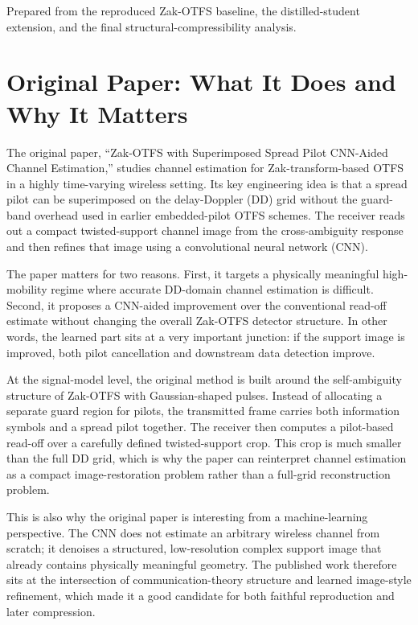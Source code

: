 \documentclass[10pt]{article}
\begin{document}
\begin{titlepage}
\vfill
\begin{center}
{\small Prepared from the reproduced Zak-OTFS baseline, the distilled-student extension, and the final structural-compressibility analysis.}
\end{center}
\end{titlepage}

\section{Original Paper: What It Does and Why It Matters}

The original paper, ``Zak-OTFS with Superimposed Spread Pilot CNN-Aided Channel Estimation,'' studies channel estimation for Zak-transform-based OTFS in a highly time-varying wireless setting. Its key engineering idea is that a spread pilot can be superimposed on the delay-Doppler (DD) grid without the guard-band overhead used in earlier embedded-pilot OTFS schemes. The receiver reads out a compact twisted-support channel image from the cross-ambiguity response and then refines that image using a convolutional neural network (CNN).

The paper matters for two reasons. First, it targets a physically meaningful high-mobility regime where accurate DD-domain channel estimation is difficult. Second, it proposes a CNN-aided improvement over the conventional read-off estimate without changing the overall Zak-OTFS detector structure. In other words, the learned part sits at a very important junction: if the support image is improved, both pilot cancellation and downstream data detection improve.

At the signal-model level, the original method is built around the self-ambiguity structure of Zak-OTFS with Gaussian-shaped pulses. Instead of allocating a separate guard region for pilots, the transmitted frame carries both information symbols and a spread pilot together. The receiver then computes a pilot-based read-off over a carefully defined twisted-support crop. This crop is much smaller than the full DD grid, which is why the paper can reinterpret channel estimation as a compact image-restoration problem rather than a full-grid reconstruction problem.

This is also why the original paper is interesting from a machine-learning perspective. The CNN does not estimate an arbitrary wireless channel from scratch; it denoises a structured, low-resolution complex support image that already contains physically meaningful geometry. The published work therefore sits at the intersection of communication-theory structure and learned image-style refinement, which made it a good candidate for both faithful reproduction and later compression.
\end{document}
